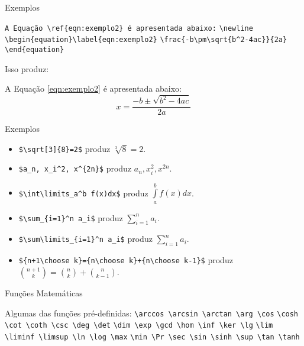 \begin{frame}[fragile]{Exemplos}

\verb|A Equação \ref{eqn:exemplo2} é apresentada abaixo:|\newline
\verb|\newline| \newline
\verb|\begin{equation}\label{eqn:exemplo2}|\newline
\verb|\frac{-b\pm\sqrt{b^2-4ac}}{2a}|\newline
\verb|\end{equation}|\newline

Isso produz:\newline

A Equação \ref{eqn:exemplo2} é apresentada abaixo: \newline
\begin{equation}\label{eqn:exemplo2}
x=\frac{-b\pm\sqrt{b^2-4ac}}{2a}
\end{equation}
\end{frame}



\begin{frame}[fragile]{Exemplos}
\begin{itemize}
\item \verb|$\sqrt[3]{8}=2$| produz $\sqrt[3]{8}=2$.
\item \verb|$a_n, x_i^2, x^{2n}$| produz $a_n, x_i^2, x^{2n}$.
\item \verb|$\int\limits_a^b f(x)dx$| produz $\int\limits_a^b f(x)dx$.
\item \verb|$\sum_{i=1}^n a_i$| produz $\sum_{i=1}^n a_i$.
\item \verb|$\sum\limits_{i=1}^n a_i$| produz $\sum\limits_{i=1}^n a_i$.
\item \verb|${n+1\choose k}={n\choose k}+{n\choose k-1}$| produz ${n+1\choose k}={n\choose k}+{n\choose k-1}$.
\end{itemize} 
\end{frame}



\begin{frame}[fragile]{Fun{\c c}\~oes Matem\'aticas}

Algumas das fun{\c c}\~oes pr\'e-definidas:
\newline \newline
\verb|\arccos \arcsin \arctan \arg \cos|
\verb|\cosh \cot \coth \csc \deg \det|
\verb|\dim \exp \gcd \hom \inf \ker \lg|
\verb|\lim \liminf \limsup \ln \log \max|
\verb|\min \Pr \sec \sin \sinh \sup \tan \tanh|

\end{frame}


